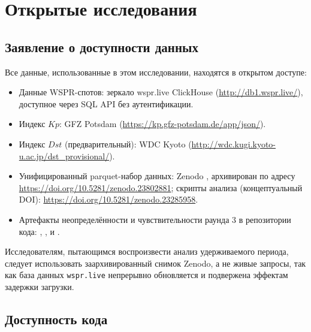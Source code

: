 \documentclass{agujournal2019}
\begin{document}
\section*{Открытые исследования}

\subsection*{Заявление о доступности данных}

Все данные, использованные в этом исследовании, находятся в открытом
доступе:

{\sloppy
\begin{itemize}
	\item Данные WSPR-спотов: зеркало wspr.live ClickHouse
	      (\url{http://db1.wspr.live/}), доступное через SQL API без
	      аутентификации.
	\item Индекс $Kp$: GFZ Potsdam
	      (\url{https://kp.gfz-potsdam.de/app/json/}).
	\item Индекс $Dst$ (предварительный): WDC Kyoto
	      (\url{http://wdc.kugi.kyoto-u.ac.jp/dst_provisional/}).
	\item Унифицированный parquet-набор данных: Zenodo
	      \citep{crosscorr_data}, архивирован по адресу
	      \url{https://doi.org/10.5281/zenodo.23802881}; скрипты анализа
	      (концептуальный DOI): \url{https://doi.org/10.5281/zenodo.23285958}.
	\item Артефакты неопределённости и чувствительности раунда 3
	      в репозитории кода: ,
	      ,
	       и
	      .
\end{itemize}
\par}

{\sloppy
Исследователям, пытающимся воспроизвести анализ удерживаемого периода,
следует использовать заархивированный снимок Zenodo, а не живые запросы,
так как база данных \texttt{wspr.live} непрерывно обновляется и подвержена
эффектам задержки загрузки.
\par}

\subsection*{Доступность кода}
\end{document}
